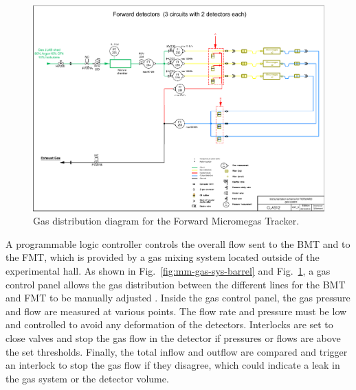 \begin{figure}[htb]
\includegraphics[width=2\columnwidth,keepaspectratio]{images/Clas12_Forward_V07_2}
 \caption{Gas distribution diagram for the Forward Micromegas Tracker.}
 \label{fig:mm-gas-sys-forward}
\end{figure}

A programmable logic controller controls the overall flow sent to the BMT and to the FMT, which is provided by a gas mixing
system located outside of the experimental hall. As shown in Fig.~\ref{fig:mm-gas-sys-barrel} and 
Fig.~\ref{fig:mm-gas-sys-forward}, a gas control panel allows the gas distribution between the different lines for the
BMT and FMT to be manually adjusted . Inside the gas control panel, the gas pressure and flow are measured at various
points. The flow rate and pressure must be low and controlled to avoid any deformation of the detectors. Interlocks are
set to close valves and stop the gas flow in the detector if pressures or flows are above the set thresholds. Finally, the
total inflow and outflow are compared and trigger an interlock to stop the gas flow if they disagree, which could indicate a
leak in the gas system or the detector volume. 

